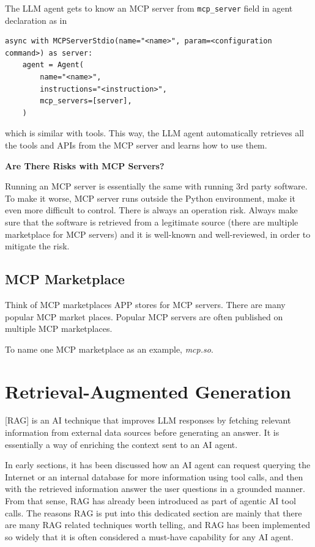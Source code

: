The LLM agent gets to know an MCP server from \verb|mcp_server| field in agent declaration as in
\begin{lstlisting}
async with MCPServerStdio(name="<name>", param=<configuration command>) as server:
	agent = Agent(
		name="<name>",
		instructions="<instruction>",
		mcp_servers=[server],
	)
\end{lstlisting}
which is similar with tools. This way, the LLM agent automatically retrieves all the tools and APIs from the MCP server and learns how to use them.

\begin{mdframed}
\noindent \textbf{Are There Risks with MCP Servers?}

Running an MCP server is essentially the same with running 3rd party software. To make it worse, MCP server runs outside the Python environment, make it even more difficult to control. There is always an operation risk. Always make sure that the software is retrieved from a legitimate source (there are multiple marketplace for MCP servers) and it is well-known and well-reviewed, in order to mitigate the risk.

\end{mdframed} 

\subsection{MCP Marketplace}

Think of MCP marketplaces APP stores for MCP servers. There are many popular MCP market places. Popular MCP servers are often published on multiple MCP marketplaces.

To name one MCP marketplace as an example, \textit{mcp.so}.

\section{Retrieval-Augmented Generation}

[RAG] is an AI technique that improves LLM responses by fetching relevant information from external data sources before generating an answer. It is essentially a way of enriching the context sent to an AI agent.

In early sections, it has been discussed how an AI agent can request querying the Internet or an internal database for more information using tool calls, and then with the retrieved information answer the user questions in a grounded manner. From that sense, RAG has already been introduced as part of agentic AI tool calls. The reasons RAG is put into this dedicated section are mainly that there are many RAG related techniques worth telling, and RAG has been implemented so widely that it is often considered a must-have capability for any AI agent.

